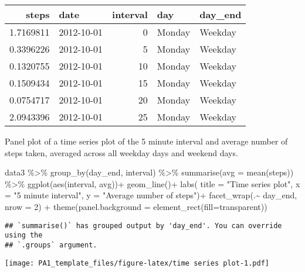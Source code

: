 \documentclass[
]{article}
\newenvironment{Shaded}{\begin{snugshade}}{\end{snugshade}}
\newcommand{\AttributeTok}[1]{\textcolor[rgb]{0.77,0.63,0.00}{#1}}
\newcommand{\DecValTok}[1]{\textcolor[rgb]{0.00,0.00,0.81}{#1}}
\newcommand{\FunctionTok}[1]{\textcolor[rgb]{0.00,0.00,0.00}{#1}}
\newcommand{\NormalTok}[1]{#1}
\newcommand{\SpecialCharTok}[1]{\textcolor[rgb]{0.00,0.00,0.00}{#1}}
\newcommand{\StringTok}[1]{\textcolor[rgb]{0.31,0.60,0.02}{#1}}
\begin{document}
\begin{longtable}[]{@{}rlrll@{}}
\toprule()
steps & date & interval & day & day\_end \\
\midrule()
\endhead
1.7169811 & 2012-10-01 & 0 & Monday & Weekday \\
0.3396226 & 2012-10-01 & 5 & Monday & Weekday \\
0.1320755 & 2012-10-01 & 10 & Monday & Weekday \\
0.1509434 & 2012-10-01 & 15 & Monday & Weekday \\
0.0754717 & 2012-10-01 & 20 & Monday & Weekday \\
2.0943396 & 2012-10-01 & 25 & Monday & Weekday \\
\bottomrule()
\end{longtable}

Panel plot of a time series plot of the 5 minute interval and average
number of steps taken, averaged across all weekday days and weekend
days.

\begin{Shaded}
\begin{Highlighting}[]
\NormalTok{data3 }\SpecialCharTok{\%\textgreater{}\%} 
  \FunctionTok{group\_by}\NormalTok{(day\_end, interval) }\SpecialCharTok{\%\textgreater{}\%} 
  \FunctionTok{summarise}\NormalTok{(}\AttributeTok{avg =} \FunctionTok{mean}\NormalTok{(steps)) }\SpecialCharTok{\%\textgreater{}\%} 
  \FunctionTok{ggplot}\NormalTok{(}\FunctionTok{aes}\NormalTok{(interval, avg))}\SpecialCharTok{+}
      \FunctionTok{geom\_line}\NormalTok{()}\SpecialCharTok{+}
      \FunctionTok{labs}\NormalTok{( }\AttributeTok{title =}  \StringTok{"Time series plot"}\NormalTok{,}
                \AttributeTok{x =}  \StringTok{"5 minute interval"}\NormalTok{,}
                \AttributeTok{y =}  \StringTok{"Average number of steps"}\NormalTok{)}\SpecialCharTok{+}
      \FunctionTok{facet\_wrap}\NormalTok{(.}\SpecialCharTok{\textasciitilde{}}\NormalTok{ day\_end, }\AttributeTok{nrow =} \DecValTok{2}\NormalTok{) }\SpecialCharTok{+}
      \FunctionTok{theme}\NormalTok{(}\AttributeTok{panel.background =} \FunctionTok{element\_rect}\NormalTok{(}\AttributeTok{fill=}\StringTok{\textquotesingle{}transparent\textquotesingle{}}\NormalTok{))}
\end{Highlighting}
\end{Shaded}

\begin{verbatim}
## `summarise()` has grouped output by 'day_end'. You can override using the
## `.groups` argument.
\end{verbatim}

\texttt{[image: PA1\_template\_files/figure-latex/time series plot-1.pdf]}
\end{document}
